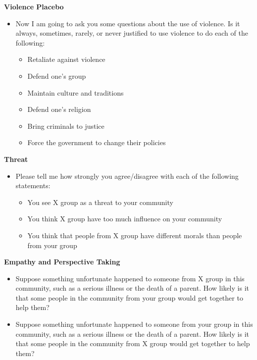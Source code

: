 \documentclass[11pt]{article}
\providecommand{\tightlist}{%
  \setlength{\itemsep}{0pt}\setlength{\parskip}{0pt}}
\begin{document}
\textbf{Violence Placebo}

\begin{itemize}
\tightlist
\item
  Now I am going to ask you some questions about the use of violence. Is
  it always, sometimes, rarely, or never justified to use violence to do
  each of the following:

  \begin{itemize}
  \tightlist
  \item
    Retaliate against violence
  \item
    Defend one's group
  \item
    Maintain culture and traditions
  \item
    Defend one's religion
  \item
    Bring criminals to justice
  \item
    Force the government to change their policies
  \end{itemize}
\end{itemize}

\textbf{Threat}

\begin{itemize}
\tightlist
\item
  Please tell me how strongly you agree/disagree with each of the
  following statements:

  \begin{itemize}
  \tightlist
  \item
    You see X group as a threat to your community
  \item
    You think X group have too much influence on your community
  \item
    You think that people from X group have different morals than people
    from your group
  \end{itemize}
\end{itemize}

\textbf{Empathy and Perspective Taking}

\begin{itemize}
\tightlist
\item
  Suppose something unfortunate happened to someone from X group in this
  community, such as a serious illness or the death of a parent. How
  likely is it that some people in the community from your group would
  get together to help them?
\item
  Suppose something unfortunate happened to someone from your group in
  this community, such as a serious illness or the death of a parent.
  How likely is it that some people in the community from X group would
  get together to help them?
\end{itemize}
\end{document}
